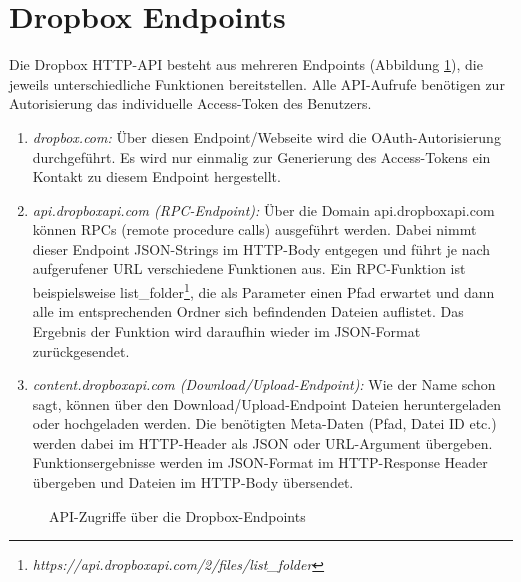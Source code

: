 \section{Dropbox Endpoints}

Die Dropbox HTTP-API besteht aus mehreren Endpoints (Abbildung \ref{04ergebnis:dpendpoints}), die jeweils unterschiedliche Funktionen bereitstellen. Alle API-Aufrufe benötigen zur Autorisierung das individuelle Access-Token des Benutzers.

\begin{enumerate}
	\item \textit{dropbox.com:} Über diesen Endpoint/Webseite wird die OAuth-Autorisierung durchgeführt. Es wird nur einmalig zur Generierung des Access-Tokens ein Kontakt zu diesem Endpoint hergestellt.
	
	\item \textit{api.dropboxapi.com (RPC-Endpoint):}  Über die Domain api.dropboxapi.com können RPCs (remote procedure calls) ausgeführt werden. Dabei nimmt dieser Endpoint JSON-Strings im HTTP-Body entgegen und führt je nach aufgerufener URL verschiedene Funktionen aus. Ein RPC-Funktion ist beispielsweise list\_{folder}\footnote{\textit{https://api.dropboxapi.com/2/files/list\_{folder}}}, die als Parameter einen Pfad erwartet und dann alle im entsprechenden Ordner sich
 befindenden Dateien auflistet. Das Ergebnis der Funktion wird daraufhin wieder im JSON-Format zurückgesendet.
 
 	\item \textit{content.dropboxapi.com (Download/Upload-Endpoint):} Wie der Name schon sagt, können über den Download/Upload-Endpoint Dateien heruntergeladen oder hochgeladen werden. Die benötigten Meta-Daten (Pfad, Datei ID etc.) werden dabei im HTTP-Header als JSON oder URL-Argument übergeben. Funktionsergebnisse werden im JSON-Format im HTTP-Response Header übergeben und Dateien im HTTP-Body übersendet.
\end{enumerate}

\begin{figure}[H]
\centering
	\scalebox{0.5}{}
	\caption{API-Zugriffe über die Dropbox-Endpoints}
	\label{04ergebnis:dpendpoints}	
\end{figure}

